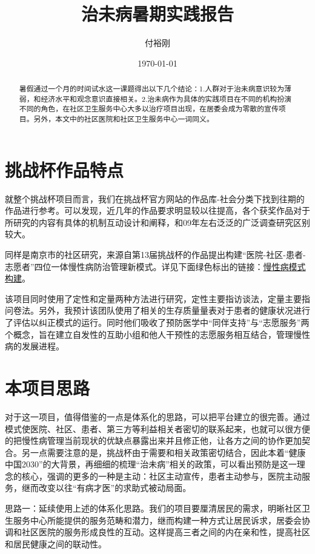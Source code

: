 \documentclass{article}
\author{付裕刚}
\title{治未病暑期实践报告}
\date{\today}
\begin{document}
    \maketitle

    \begin{abstract}
        暑假通过一个月的时间试水这一课题得出以下几个结论：1.人群对于治未病意识较为薄弱，和经济水平和观念意识直接相关。2.治未病作为具体的实践项目在不同的机构扮演不同的角色，在社区卫生服务中心大多以治疗项目出现，在居委会成为零散的宣传项目。另外，本文中的社区医院和社区卫生服务中心一词同义。
    \end{abstract}
    \clearpage
    \section{挑战杯作品特点}
    就整个挑战杯项目而言，我们在挑战杯官方网站的作品库-社会分类下找到往期的作品进行参考。可以发现，近几年的作品要求明显较以往提高，各个获奖作品对于所研究的内容有具体的机制互动设计和阐释，和09年左右泛泛的广泛调查研究区别较大。
    
    同样是南京市的社区研究，来源自第13届挑战杯的作品提出构建“医院-社区-患者-志愿者”四位一体慢性病防治管理新模式。详见下面绿色标出的链接：\href{http://2017.tiaozhanbei.net/d37/project/124/}{慢性病模式构建}。
    
    该项目同时使用了定性和定量两种方法进行研究，定性主要指访谈法，定量主要指问卷法。另外，我预计该团队使用了相关的生存质量量表对于患者的健康状况进行了评估以纠正模式的运行。同时他们吸收了预防医学中“同伴支持”与“志愿服务”两个概念，旨在建立自发性的互助小组和他人干预性的志愿服务相互结合，管理慢性病的发展进程。
    \section{本项目思路}
    对于这一项目，值得借鉴的一点是体系化的思路，可以把平台建立的很完善。通过模式使医院、社区、患者、第三方等利益相关者密切的联系起来，也就可以很方便的把慢性病管理当前现状的优缺点暴露出来并且修正他，让各方之间的协作更加契合。另一点需要注意的是，挑战杯由于需要和相关政策密切结合，因此本着“健康中国2030”的大背景，再细细的梳理“治未病”相关的政策，可以看出预防是这一理念的核心，强调的更多的一种是主动：社区主动宣传，患者主动参与，医院主动服务，继而改变以往“有病才医”的求助式被动局面。
    
    思路一：延续使用上述的体系化思路。我们的项目要厘清居民的需求，明晰社区卫生服务中心所能提供的服务范畴和潜力，继而构建一种方式让居民诉求，居委会协调和社区医院的服务形成良性的互动。这样提高三者之间的内在亲和性，提高社区和居民健康之间的联动性。
    
\end{document}
